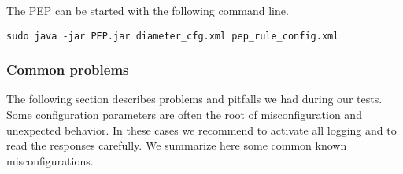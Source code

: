 The PEP can be started with the following command line. 

\begin{lstlisting}[caption=Example of a PEP Enforcement Setting, label={lst:PEPContainer}]
sudo java -jar PEP.jar diameter_cfg.xml pep_rule_config.xml
\end{lstlisting}

\subsubsection{Common problems}
The following section describes problems and pitfalls we had during our tests.
Some configuration parameters are often the root of misconfiguration and unexpected behavior. 
In these cases we recommend to activate all logging and to read the responses carefully. We summarize here some common known misconfigurations.

